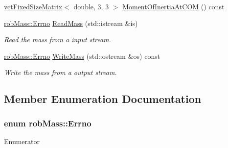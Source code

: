 \begin{DoxyCompactItemize}
\hyperlink{classvct_fixed_size_matrix}{vct\-Fixed\-Size\-Matrix}$<$ double, 3, 3 $>$ \hyperlink{classrob_mass_aae2190ef44e17e969f3265129b0ca093}{Moment\-Of\-Inertia\-At\-C\-O\-M} () const 
\item 
\hyperlink{classrob_mass_a85e715c568a7c8b1fff957b046164649}{rob\-Mass\-::\-Errno} \hyperlink{classrob_mass_a148ed4305b5291bc764cb9be17584d33}{Read\-Mass} (std\-::istream \&is)
\begin{DoxyCompactList}\small\item\em Read the mass from a input stream. \end{DoxyCompactList}\item 
\hyperlink{classrob_mass_a85e715c568a7c8b1fff957b046164649}{rob\-Mass\-::\-Errno} \hyperlink{classrob_mass_a6b11b3b2725686b58a91a441b809cec4}{Write\-Mass} (std\-::ostream \&os) const 
\begin{DoxyCompactList}\small\item\em Write the mass from a output stream. \end{DoxyCompactList}\end{DoxyCompactItemize}


\subsection{Member Enumeration Documentation}
\hypertarget{classrob_mass_a85e715c568a7c8b1fff957b046164649}{
\subsubsection[{Errno}]{\setlength{\rightskip}{0pt plus 5cm}enum {\bf rob\-Mass\-::\-Errno}}}\label{classrob_mass_a85e715c568a7c8b1fff957b046164649}
\begin{Desc}
\item[Enumerator]\par
\begin{description}
\item[{\em 
\hypertarget{classrob_mass_a85e715c568a7c8b1fff957b046164649add68e16ef430713d59f0adb01b14b94e}{E\-S\-U\-C\-C\-E\-S\-S}\label{classrob_mass_a85e715c568a7c8b1fff957b046164649add68e16ef430713d59f0adb01b14b94e}
}]\item[{\em 
\hypertarget{classrob_mass_a85e715c568a7c8b1fff957b046164649a73f4b04ad9d26f8bd81f6bdc9cee9a66}{E\-F\-A\-I\-L\-U\-R\-E}\label{classrob_mass_a85e715c568a7c8b1fff957b046164649a73f4b04ad9d26f8bd81f6bdc9cee9a66}
}]\end{description}
\end{Desc}


